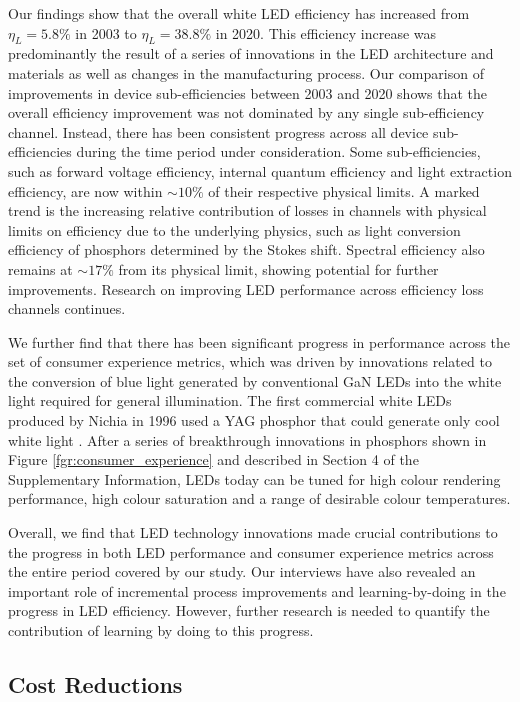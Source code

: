 \documentclass[journal=jacsat,manuscript=article]{achemso}
\begin{document}
Our findings show that the overall white LED efficiency has increased from $\eta_L=5.8\%$ in 2003 to $\eta_L=38.8\%$ in 2020. This efficiency increase was predominantly the result of a series of innovations in the LED architecture and materials as well as changes in the manufacturing process. Our comparison of improvements in device sub-efficiencies between 2003 and 2020 shows that the overall efficiency improvement was not dominated by any single sub-efficiency channel. Instead, there has been consistent progress across all device sub-efficiencies during the time period under consideration. Some sub-efficiencies, such as forward voltage efficiency, internal quantum efficiency and light extraction efficiency, are now within $\sim10\%$ of their respective physical limits. A marked trend is the increasing relative contribution of losses in channels with physical limits on efficiency due to the underlying physics, such as light conversion efficiency of phosphors determined by the Stokes shift. Spectral efficiency also remains at $\sim17\%$ from its physical limit, showing potential for further improvements. Research on improving LED performance across efficiency loss channels continues\cite{cho2017white}\cite{Weisbuch2020}.

We further find that there has been significant progress in performance across the set of consumer experience metrics, which was driven by innovations related to the conversion of blue light generated by conventional GaN LEDs into the white light required for general illumination. The first commercial white LEDs produced by Nichia in 1996 used a YAG phosphor that could generate only cool white light \cite{bando1998development}. After a series of breakthrough innovations in phosphors shown in Figure \ref{fgr:consumer_experience} and described in Section 4 of the Supplementary Information, LEDs today can be tuned for high colour rendering performance, high colour saturation and a range of desirable colour temperatures. 

Overall, we find that LED technology innovations made crucial contributions to the progress in both LED performance and consumer experience metrics across the entire period covered by our study. Our interviews have also revealed an important role of incremental process improvements and learning-by-doing\cite{WRIGHT_1936}\cite{Arrow_1962} in the progress in LED efficiency. However, further research is needed to quantify the contribution of learning by doing to this progress.

\subsection{Cost Reductions}
\end{document}
